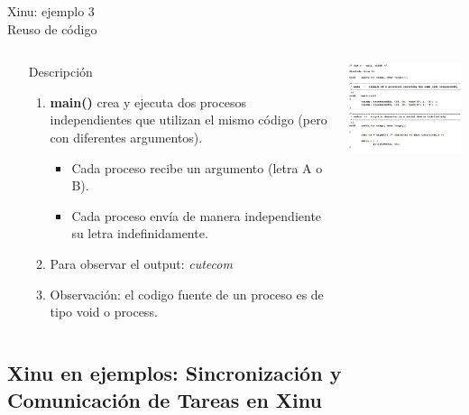 \documentclass[8pt,aspectratio=169,compress]{beamer}
\begin{document}
\begin{frame}[fragile]{Xinu: ejemplo 3 \\ Reuso de código}

    \begin{columns}[onlytextwidth,T]
      \column{\dimexpr\linewidth-70mm-5mm}

\begin{small}
\begin{itemize}
\bigskip
  \item[Descripción]
\begin{enumerate}
\item \textbf{main()} crea y ejecuta dos procesos independientes que utilizan el mismo código (pero con diferentes argumentos).
	\begin{itemize}
\item Cada proceso recibe un argumento (letra A o B).
\item Cada proceso envía de manera independiente su letra indefinidamente.
	\end{itemize}

\bigskip
\item Para observar el output: \textit{cutecom}
\bigskip
\item Observación: el codigo fuente de un proceso es de tipo void o process.
\end{enumerate}
	\end{itemize}

\end{small}

      \column{70mm}
     \includegraphics[width=70mm]{images/ejemplo3.jpg}

    \end{columns}
\end{frame}





\subsection{Xinu en ejemplos: Sincronización y Comunicación de Tareas en Xinu}
\end{document}
